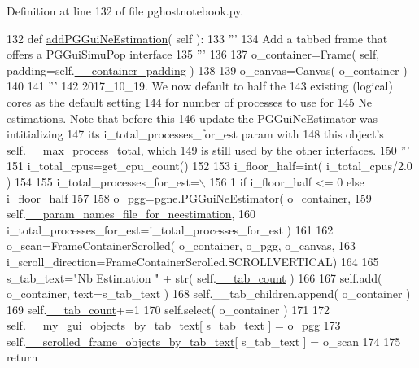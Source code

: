Definition at line 132 of file pghostnotebook.\+py.


\begin{DoxyCode}
132     \textcolor{keyword}{def }\hyperlink{classnegui_1_1pghostnotebook_1_1PGHostNotebook_a9242f6b6eff030ac5de8db425e1585f9}{addPGGuiNeEstimation}( self ):
133         \textcolor{stringliteral}{'''}
134 \textcolor{stringliteral}{        Add a tabbed frame that offers a PGGuiSimuPop interface}
135 \textcolor{stringliteral}{        '''}
136 
137         o\_container=Frame( self, padding=self.\hyperlink{classnegui_1_1pghostnotebook_1_1PGHostNotebook_a790570fc06951c4ccc142a26c01668ef}{\_\_container\_padding} )
138 
139         o\_canvas=Canvas( o\_container )
140 
141         \textcolor{stringliteral}{'''}
142 \textcolor{stringliteral}{        2017\_10\_19.  We now default to half the }
143 \textcolor{stringliteral}{        existing (logical) cores as the default setting}
144 \textcolor{stringliteral}{        for number of processes to use for }
145 \textcolor{stringliteral}{        Ne estimations.  Note that before this}
146 \textcolor{stringliteral}{        update  the PGGuiNeEstimator was intitializing }
147 \textcolor{stringliteral}{        its i\_total\_processes\_for\_est param with}
148 \textcolor{stringliteral}{        this object's self.\_\_max\_process\_total, which}
149 \textcolor{stringliteral}{        is still used by the other interfaces.}
150 \textcolor{stringliteral}{        '''}
151         i\_total\_cpus=get\_cpu\_count()
152 
153         i\_floor\_half=int( i\_total\_cpus/2.0 )
154         
155         i\_total\_processes\_for\_est=\(\backslash\)
156                 1 \textcolor{keywordflow}{if} i\_floor\_half <= 0 \textcolor{keywordflow}{else} i\_floor\_half
157 
158         o\_pgg=pgne.PGGuiNeEstimator( o\_container, 
159                         self.\hyperlink{classnegui_1_1pghostnotebook_1_1PGHostNotebook_a38f70ee82a0a2852953b964623a4c871}{\_\_param\_names\_file\_for\_neestimation},
160                         i\_total\_processes\_for\_est=i\_total\_processes\_for\_est )
161 
162         o\_scan=FrameContainerScrolled( o\_container, o\_pgg, o\_canvas, 
163         i\_scroll\_direction=FrameContainerScrolled.SCROLLVERTICAL)
164 
165         s\_tab\_text=\textcolor{stringliteral}{"Nb Estimation "} + str( self.\hyperlink{classnegui_1_1pghostnotebook_1_1PGHostNotebook_a84a7417cc57500cbe5c230449ba464b3}{\_\_tab\_count} )
166 
167         self.add( o\_container, text=s\_tab\_text )
168         self.\_\_tab\_children.append( o\_container )
169         self.\hyperlink{classnegui_1_1pghostnotebook_1_1PGHostNotebook_a84a7417cc57500cbe5c230449ba464b3}{\_\_tab\_count}+=1
170         self.select( o\_container )
171 
172         self.\hyperlink{classnegui_1_1pghostnotebook_1_1PGHostNotebook_af4966fb6fc80c08cd38bf21b2c723364}{\_\_my\_gui\_objects\_by\_tab\_text}[ s\_tab\_text ] = o\_pgg 
173         self.\hyperlink{classnegui_1_1pghostnotebook_1_1PGHostNotebook_a5f9ed267b317c56e1da89ef894a2b52a}{\_\_scrolled\_frame\_objects\_by\_tab\_text}[ s\_tab\_text ] = 
      o\_scan
174 
175         \textcolor{keywordflow}{return}
\end{DoxyCode}
